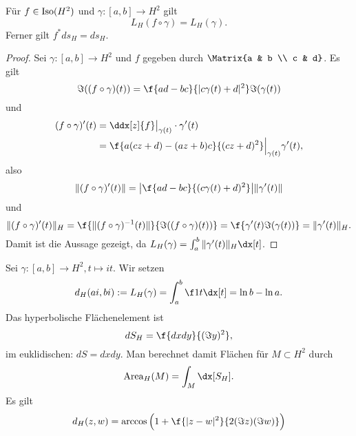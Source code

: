 \begin{lem}
	Für $f \in \operatorname{Iso}(H^2)$ und $\gamma: [a,b] \to H^2$ gilt
	\[
		L_H(f \circ \gamma) = L_H(\gamma).
	\]
	Ferner gilt $f^* ds_H = ds_H$.
	\begin{proof}
		Sei $\gamma: [a,b] \to H^2$ und $f$ gegeben durch $\Matrix{a & b \\ c & d}$.
		Es gilt
		\[
			\Im((f\circ \gamma)(t))
			= \f {ad - bc}{|c \gamma(t) + d|^2} \Im(\gamma(t))
		\]
		und
		\begin{align*}
			(f\circ \gamma)'(t)
			&= \ddx[z]{f}\big|_{\gamma(t)} \cdot \gamma'(t) \\
			&= \f{a(cz + d) - (az + b)c}{(cz + d)^2} \Big|_{\gamma(t)} \gamma'(t),
		\end{align*}
		also
		\[
			\|(f\circ \gamma)'(t)\|
			= \big| \f{ad - bc}{(c \gamma(t) + d)^2} \big| \|\gamma'(t)\|
		\]
		und
		\[
			\|(f\circ \gamma)'(t)\|_H
			= \f {\|(f\circ \gamma)^{-1}(t)\|}{\Im((f\circ \gamma)(t))}
			= \f {\gamma'(t){\Im(\gamma(t))}}
			= \| \gamma'(t)\|_H.
		\]
		Damit ist die Aussage gezeigt, da $L_H(\gamma) = \int_a^b \|\gamma'(t)\|_H \dx[t]$.
	\end{proof}
\end{lem}

Sei $\gamma: [a,b] \to H^2, t \mapsto it$.
Wir setzen
\[
	d_H(ai, bi) := L_H(\gamma)
	= \int_a^b \f 1t \dx[t]
	= \ln b - \ln a.
\]
Das hyperbolische Flächenelement ist
\[
	dS_H = \f {dx dy}{(\Im y)^2},
\]
im euklidischen: $dS = dxdy$.
Man berechnet damit Flächen für $M \subset H^2$ durch
\[
	\Area_H(M)
	= \int_M \dx[S_H].
\]
Es gilt
\[
	d_H(z, w)
	= \arccos\Big( 1 + \f{|z-w|^2}{2(\Im z)(\Im w)}\Big)
\]
